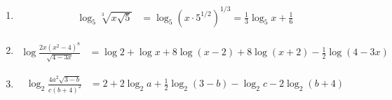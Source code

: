 \documentclass{ximera}
\begin{document}
\begin{problem}
\begin{solution}
\begin{enumerate}
  \item[(f)]
  \begin{align*}
    \log_5\sqrt[3]{x\sqrt{5}} &= \log_5\!\left(x\cdot 5^{1/2}\right)^{1/3} = \tfrac{1}{3}\log_5 x + \tfrac{1}{6}
  \end{align*}

  \item[(g)]
  \begin{align*}
    \log\frac{2x(x^2-4)^8}{\sqrt{4-3x}} &= \log 2 + \log x + 8\log(x-2) + 8\log(x+2) - \tfrac{1}{2}\log(4-3x)
  \end{align*}

  \item[(h)]
  \begin{align*}
    \log_2\frac{4a^2\sqrt{3-b}}{c(b+4)^2} &= 2 + 2\log_2 a + \tfrac{1}{2}\log_2(3-b) - \log_2 c - 2\log_2(b+4)
  \end{align*}
\end{enumerate}
\end{solution}
\end{problem}
\end{document}
